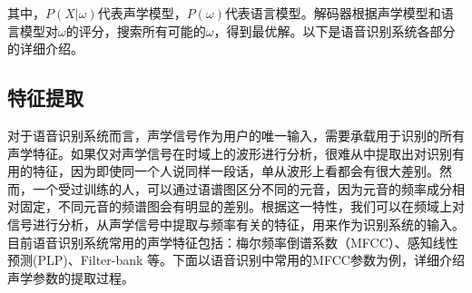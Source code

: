 其中，$P(X|\omega)$代表声学模型，$P(\omega)$代表语言模型。解码器根据声学模型和语言模型对$\omega$的评分，搜索所有可能的$\omega$，得到最优解。以下是语音识别系统各部分的详细介绍。
\subsection{特征提取}\label{MFCC}
对于语音识别系统而言，声学信号作为用户的唯一输入，需要承载用于识别的所有声学特征。如果仅对声学信号在时域上的波形进行分析，很难从中提取出对识别有用的特征，因为即使同一个人说同样一段话，单从波形上看都会有很大差别。然而，一个受过训练的人，可以通过语谱图区分不同的元音，因为元音的频率成分相对固定，不同元音的频谱图会有明显的差别。根据这一特性，我们可以在频域上对信号进行分析，从声学信号中提取与频率有关的特征，用来作为识别系统的输入。目前语音识别系统常用的声学特征包括：梅尔频率倒谱系数（MFCC）\cite{davis1980comparison}、感知线性预测(PLP)\cite{hermansky1990perceptual}、Filter-bank\cite{juang1987use} 等。下面以语音识别中常用的MFCC参数为例，详细介绍声学参数的提取过程。

